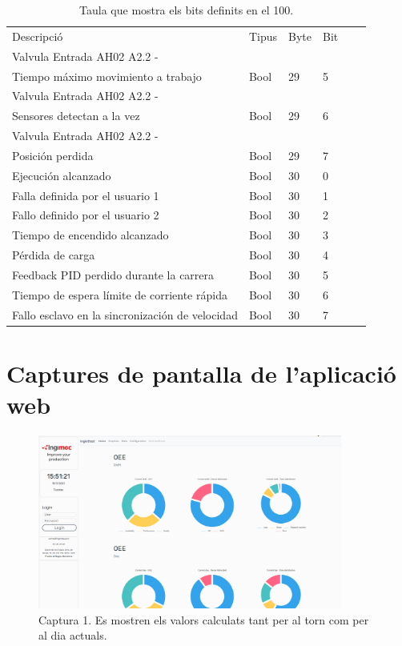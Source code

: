 \documentclass{tfgitic}[2022/06/30]
\begin{document}
\begin{table}[t]
\centering
\label{table:db100}
\begin{tabular}{
>{\columncolor[HTML]{EBEAEA}}llllll}
\cellcolor[HTML]{D3D3D3} Descripció & \cellcolor[HTML]{D3D3D3} Tipus & \cellcolor[HTML]{D3D3D3} Byte &  \cellcolor[HTML]{D3D3D3} Bit \\
Valvula Entrada AH02 A2.2 -\\Tiempo máximo movimiento a trabajo& Bool & 29 & 5 \\
Valvula Entrada AH02 A2.2 -\\Sensores detectan a la vez& Bool & 29 & 6 \\
Valvula Entrada AH02 A2.2 -\\Posición perdida& Bool & 29 & 7 \\
Ejecución alcanzado& Bool & 30 & 0 \\
Falla definida por el usuario 1& Bool & 30 & 1 \\
Fallo definido por el usuario 2& Bool & 30 & 2 \\
Tiempo de encendido alcanzado& Bool & 30 & 3 \\
Pérdida de carga& Bool & 30 & 4 \\
Feedback PID perdido durante la carrera& Bool & 30 & 5 \\
Tiempo de espera límite de corriente rápida& Bool & 30 & 6 \\
Fallo esclavo en la sincronización de velocidad& Bool & 30 & 7 \\
\end{tabular}
\caption{Taula que mostra els bits definits en el  100.}
\end{table}

\chapter{Captures de pantalla de l'aplicació web}
\label{anex: iuScreenshots}

\begin{figure}[h]
\centering
\includegraphics[width=10cm]{img/webScreenshot01.png}
\caption{Captura 1. Es mostren els valors calculats tant per al torn com per al dia actuals.}
\label{webScreen01}
\end{figure}
\end{document}
